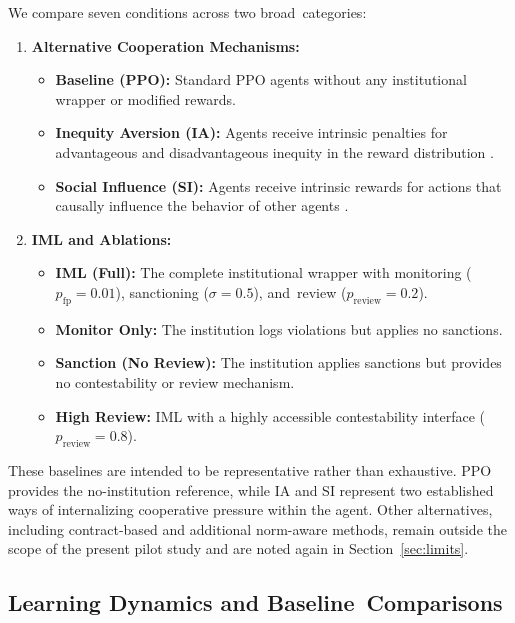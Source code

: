 \documentclass[mca,article,accept,pdftex,oneauthor]{Definitions/mdpi}
\begin{document}
We compare seven conditions across two broad~categories:
\begin{enumerate}
    \item \textbf{Alternative Cooperation Mechanisms:}
    \begin{itemize}
        \item \textbf{Baseline (PPO):} Standard PPO agents without any institutional wrapper or modified rewards.
        \item \textbf{Inequity Aversion (IA):} Agents receive intrinsic penalties for advantageous and disadvantageous inequity in the reward distribution \citep{Hughes2018InequityAversion}.
        \item \textbf{Social Influence (SI):} Agents receive intrinsic rewards for actions that causally influence the behavior of other agents \citep{Jaques2019SocialInfluence}.
    \end{itemize}
    \item \textbf{IML and Ablations:}
    \begin{itemize}
        \item \textbf{IML (Full):} The complete institutional wrapper with monitoring ($p_{\mathrm{fp}}=0.01$), sanctioning ($\sigma=0.5$), and~review ($p_{\mathrm{review}}=0.2$).
        \item \textbf{Monitor Only:} The institution logs violations but applies no sanctions.
        \item \textbf{Sanction (No Review):} The institution applies sanctions but provides no contestability or review mechanism.
        \item \textbf{High Review:} IML with a highly accessible contestability interface (\mbox{$p_{\mathrm{review}}=0.8$}).
    \end{itemize}
\end{enumerate}

These baselines are intended to be representative rather than exhaustive. PPO provides the no-institution reference, while IA and SI represent two established ways of internalizing cooperative pressure within the agent. Other alternatives, including contract-based and additional norm-aware methods, remain outside the scope of the present pilot study and are noted again in Section~\ref{sec:limits}.

\subsection{Learning Dynamics and Baseline~Comparisons}
\end{document}
